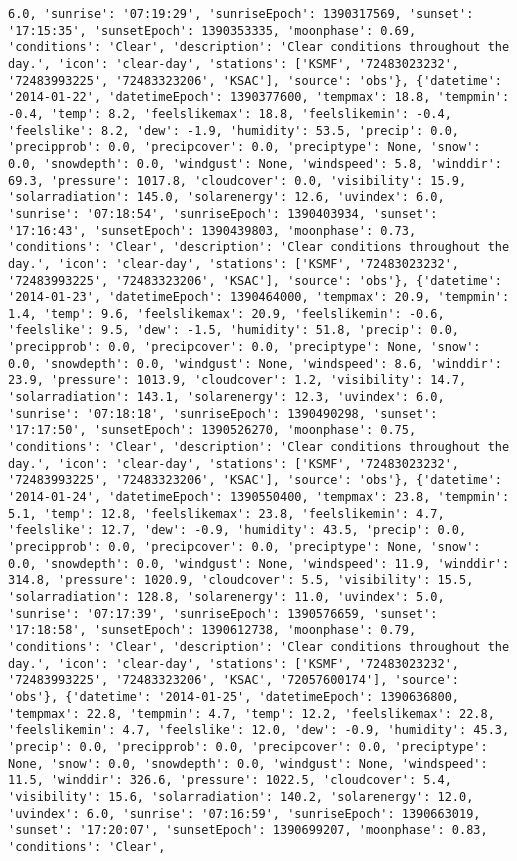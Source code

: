 \documentclass[
  letterpaper,
  DIV=11,
  numbers=noendperiod]{scrartcl}
\begin{document}
\begin{verbatim}
6.0, 'sunrise': '07:19:29', 'sunriseEpoch': 1390317569, 'sunset': '17:15:35', 'sunsetEpoch': 1390353335, 'moonphase': 0.69, 'conditions': 'Clear', 'description': 'Clear conditions throughout the day.', 'icon': 'clear-day', 'stations': ['KSMF', '72483023232', '72483993225', '72483323206', 'KSAC'], 'source': 'obs'}, {'datetime': '2014-01-22', 'datetimeEpoch': 1390377600, 'tempmax': 18.8, 'tempmin': -0.4, 'temp': 8.2, 'feelslikemax': 18.8, 'feelslikemin': -0.4, 'feelslike': 8.2, 'dew': -1.9, 'humidity': 53.5, 'precip': 0.0, 'precipprob': 0.0, 'precipcover': 0.0, 'preciptype': None, 'snow': 0.0, 'snowdepth': 0.0, 'windgust': None, 'windspeed': 5.8, 'winddir': 69.3, 'pressure': 1017.8, 'cloudcover': 0.0, 'visibility': 15.9, 'solarradiation': 145.0, 'solarenergy': 12.6, 'uvindex': 6.0, 'sunrise': '07:18:54', 'sunriseEpoch': 1390403934, 'sunset': '17:16:43', 'sunsetEpoch': 1390439803, 'moonphase': 0.73, 'conditions': 'Clear', 'description': 'Clear conditions throughout the day.', 'icon': 'clear-day', 'stations': ['KSMF', '72483023232', '72483993225', '72483323206', 'KSAC'], 'source': 'obs'}, {'datetime': '2014-01-23', 'datetimeEpoch': 1390464000, 'tempmax': 20.9, 'tempmin': 1.4, 'temp': 9.6, 'feelslikemax': 20.9, 'feelslikemin': -0.6, 'feelslike': 9.5, 'dew': -1.5, 'humidity': 51.8, 'precip': 0.0, 'precipprob': 0.0, 'precipcover': 0.0, 'preciptype': None, 'snow': 0.0, 'snowdepth': 0.0, 'windgust': None, 'windspeed': 8.6, 'winddir': 23.9, 'pressure': 1013.9, 'cloudcover': 1.2, 'visibility': 14.7, 'solarradiation': 143.1, 'solarenergy': 12.3, 'uvindex': 6.0, 'sunrise': '07:18:18', 'sunriseEpoch': 1390490298, 'sunset': '17:17:50', 'sunsetEpoch': 1390526270, 'moonphase': 0.75, 'conditions': 'Clear', 'description': 'Clear conditions throughout the day.', 'icon': 'clear-day', 'stations': ['KSMF', '72483023232', '72483993225', '72483323206', 'KSAC'], 'source': 'obs'}, {'datetime': '2014-01-24', 'datetimeEpoch': 1390550400, 'tempmax': 23.8, 'tempmin': 5.1, 'temp': 12.8, 'feelslikemax': 23.8, 'feelslikemin': 4.7, 'feelslike': 12.7, 'dew': -0.9, 'humidity': 43.5, 'precip': 0.0, 'precipprob': 0.0, 'precipcover': 0.0, 'preciptype': None, 'snow': 0.0, 'snowdepth': 0.0, 'windgust': None, 'windspeed': 11.9, 'winddir': 314.8, 'pressure': 1020.9, 'cloudcover': 5.5, 'visibility': 15.5, 'solarradiation': 128.8, 'solarenergy': 11.0, 'uvindex': 5.0, 'sunrise': '07:17:39', 'sunriseEpoch': 1390576659, 'sunset': '17:18:58', 'sunsetEpoch': 1390612738, 'moonphase': 0.79, 'conditions': 'Clear', 'description': 'Clear conditions throughout the day.', 'icon': 'clear-day', 'stations': ['KSMF', '72483023232', '72483993225', '72483323206', 'KSAC', '72057600174'], 'source': 'obs'}, {'datetime': '2014-01-25', 'datetimeEpoch': 1390636800, 'tempmax': 22.8, 'tempmin': 4.7, 'temp': 12.2, 'feelslikemax': 22.8, 'feelslikemin': 4.7, 'feelslike': 12.0, 'dew': -0.9, 'humidity': 45.3, 'precip': 0.0, 'precipprob': 0.0, 'precipcover': 0.0, 'preciptype': None, 'snow': 0.0, 'snowdepth': 0.0, 'windgust': None, 'windspeed': 11.5, 'winddir': 326.6, 'pressure': 1022.5, 'cloudcover': 5.4, 'visibility': 15.6, 'solarradiation': 140.2, 'solarenergy': 12.0, 'uvindex': 6.0, 'sunrise': '07:16:59', 'sunriseEpoch': 1390663019, 'sunset': '17:20:07', 'sunsetEpoch': 1390699207, 'moonphase': 0.83, 'conditions': 'Clear', 
\end{verbatim}
\end{document}
